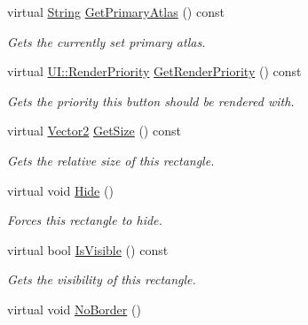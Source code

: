\begin{DoxyCompactItemize}
virtual \hyperlink{namespaceMezzanine_acf9fcc130e6ebf08e3d8491aebcf1c86}{String} \hyperlink{classMezzanine_1_1UI_1_1Rectangle_a1ac92749826bce7b8f9b3d3e9d27a12f}{GetPrimaryAtlas} () const 
\begin{DoxyCompactList}\small\item\em Gets the currently set primary atlas. \item\end{DoxyCompactList}\item 
virtual \hyperlink{namespaceMezzanine_1_1UI_ac4c753eb6b5d66350a243acc9ce54130}{UI::RenderPriority} \hyperlink{classMezzanine_1_1UI_1_1Rectangle_a552cc0809a838c25f39248d16b591518}{GetRenderPriority} () const 
\begin{DoxyCompactList}\small\item\em Gets the priority this button should be rendered with. \item\end{DoxyCompactList}\item 
virtual \hyperlink{classMezzanine_1_1Vector2}{Vector2} \hyperlink{classMezzanine_1_1UI_1_1Rectangle_a2deccb0b2e08116b01941afdd4eb7475}{GetSize} () const 
\begin{DoxyCompactList}\small\item\em Gets the relative size of this rectangle. \item\end{DoxyCompactList}\item 
\hypertarget{classMezzanine_1_1UI_1_1Rectangle_a95c50cd38af0f250ff5902d54b5f425e}{
virtual void \hyperlink{classMezzanine_1_1UI_1_1Rectangle_a95c50cd38af0f250ff5902d54b5f425e}{Hide} ()}
\label{classMezzanine_1_1UI_1_1Rectangle_a95c50cd38af0f250ff5902d54b5f425e}

\begin{DoxyCompactList}\small\item\em Forces this rectangle to hide. \item\end{DoxyCompactList}\item 
virtual bool \hyperlink{classMezzanine_1_1UI_1_1Rectangle_a71056f4bec912c0b4c9b3cc48ed34ec5}{IsVisible} () const 
\begin{DoxyCompactList}\small\item\em Gets the visibility of this rectangle. \item\end{DoxyCompactList}\item 
\hypertarget{classMezzanine_1_1UI_1_1Rectangle_ac6940d920a491fde80b9df599fab9daa}{
virtual void \hyperlink{classMezzanine_1_1UI_1_1Rectangle_ac6940d920a491fde80b9df599fab9daa}{NoBorder} ()}
\label{classMezzanine_1_1UI_1_1Rectangle_ac6940d920a491fde80b9df599fab9daa}


\end{DoxyCompactItemize}
